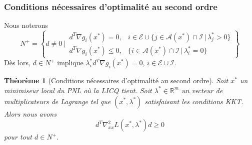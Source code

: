 \documentclass[usepdftitle=false,aspectratio=169]{beamer}
\newtheorem{thm}{Théorème}
\def\cA{\mathcal{A}}
\def\cE{\mathcal{E}}
\def\cI{\mathcal{I}}
\def\RR{\mathbb{R}}
\begin{document}
\begin{frame}
	\frametitle{Conditions nécessaires d'optimalité au second ordre}
	
Nous noterons
$$
N^+ =
\left\lbrace d \ne 0 \,\bigg|\,
\begin{matrix}
d^T \nabla g_i(x^*) = 0, & i \in \cE \cup \{ j \in \cA(x^*) \cap \cI \,|\, \lambda_j^* > 0 \} \\
d^T \nabla g_i(x^*) \leq 0, & \{ i \in \cA(x^*) \cap \cI \,|\, \lambda_i^* = 0 \} 
\end{matrix}
\right\rbrace
$$
Dès lors, $d \in N^+$ implique $\lambda_i^* d^T \nabla g_i(x^*) = 0$, $i \in \cE \cup \cI$.



\mbox{}

\begin{thm}[Conditions nécessaires d'optimalité au second ordre]
Soit $x^*$ un minimiseur local du PNL où la LICQ tient.
Soit $\lambda^* \in \RR^m$ un vecteur de multiplicateurs de Lagrange tel que $(x^*, \lambda^*)$ satisfaisant les conditions KKT.
Alors nous avons
$$
d^T \nabla^2_{xx} L(x^*, \lambda^*) d \geq 0
$$
pour tout $d \in N^+$.
\end{thm}

\end{frame}
\end{document}
